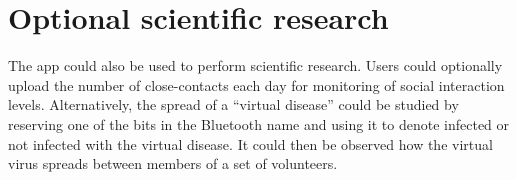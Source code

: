 \documentclass{article}
\begin{document}
\section{Optional scientific research}

The app could also be used to perform scientific research. Users could optionally upload the number of close-contacts each day for monitoring of social interaction levels. Alternatively, the spread of a ``virtual disease'' could be studied by reserving one of the bits in the Bluetooth name and using it to denote infected or not infected with the virtual disease. It could then be observed how the virtual virus spreads between members of a set of volunteers.

%
% 


\end{document}
